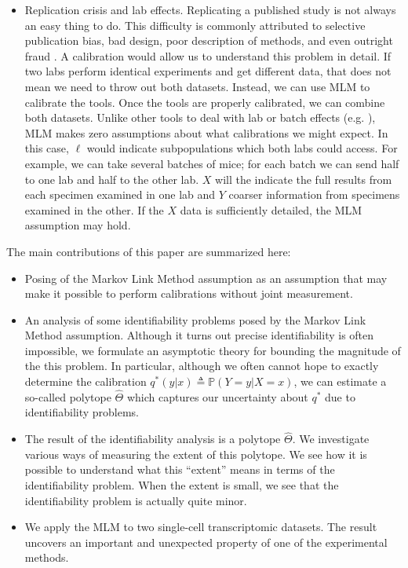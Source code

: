 \begin{itemize}
    \item Replication crisis and lab effects.  Replicating a published study is not always an easy thing to do.  This difficulty is commonly attributed to selective publication bias, bad design, poor description of methods, and even outright fraud \cite{baker2016reproducibility}.  A calibration would allow us to understand this problem in detail.  If two labs perform identical experiments and get different data, that does not mean we need to throw out both datasets.  Instead, we can use MLM to calibrate the tools.  Once the tools are properly calibrated, we can combine both datasets.  Unlike other tools to deal with lab or batch effects (e.g. \cite{crow2018characterizing,johnson2007adjusting}), MLM makes zero assumptions about what calibrations we might expect.  In this case, $\ell$ would indicate subpopulations which both labs could access.  For example, we can take several batches of mice; for each batch we can send half to one lab and half to the other lab.  $X$ will the indicate the full results from each specimen examined in one lab and $Y$ coarser information from specimens examined in the other.  If the $X$ data is sufficiently detailed, the MLM assumption may hold.  
\end{itemize}

The main contributions of this paper are summarized here:

\begin{itemize}
\item Posing of the Markov Link Method assumption as an assumption that may make it possible to perform calibrations without joint measurement.
\item An analysis of some identifiability problems posed by the Markov Link Method assumption.  Although it turns out precise identifiability is often impossible, we formulate an asymptotic theory for bounding the magnitude of the this problem.  In particular, although we often cannot hope to exactly determine the calibration $q^*(y|x)\triangleq\mathbb{P}(Y=y|X=x)$, we can estimate a so-called polytope $\hat \Theta$ which captures our uncertainty about $q^*$ due to identifiability problems.
\item The result of the identifiability analysis is a polytope $\hat \Theta$.  We investigate various ways of measuring the extent of this polytope.  We see how it is possible to understand what this ``extent'' means in terms of the identifiability problem.  When the extent is small, we see that the identifiability problem is actually quite minor.
\item We apply the MLM to two single-cell transcriptomic datasets.  The result uncovers an important and unexpected property of one of the experimental methods.  
\end{itemize}

